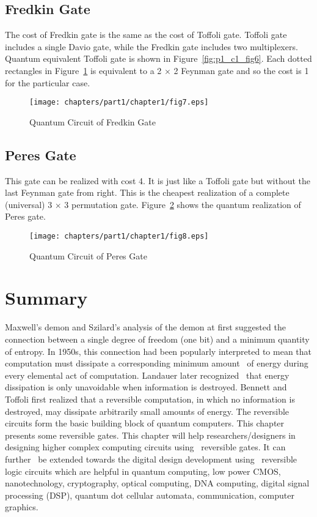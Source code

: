 \subsection{Fredkin Gate}
The cost of Fredkin gate is the same as the cost of Toffoli gate. Toffoli gate includes a single Davio gate, while the Fredkin gate includes two multiplexers. Quantum equivalent Toffoli gate is shown in Figure~\ref{fig:p1_c1_fig6}. Each dotted rectangles in Figure~\ref{fig:p1_c1_fig7} is equivalent to a 2 $\times$ 2 Feynman gate and so the cost is 1 for the particular case.

\begin{figure}[h]
\centering
\texttt{[image: chapters/part1/chapter1/fig7.eps]}
\caption{Quantum Circuit of Fredkin Gate}
\label{fig:p1_c1_fig7}
\end{figure}

\subsection{Peres Gate}
This gate can be realized with cost 4. It is just like a Toffoli gate but without the last Feynman gate from right. This is the cheapest realization of a complete (universal) 3 $\times$ 3 permutation gate. Figure~\ref{fig:p1_c1_fig8} shows the quantum realization of Peres gate.
\\
\begin{figure}[h]
\centering
\texttt{[image: chapters/part1/chapter1/fig8.eps]}
\caption{Quantum Circuit of Peres Gate}
\label{fig:p1_c1_fig8}
\end{figure}

\section{Summary}
Maxwell's demon and Szilard's analysis of the demon at first suggested the connection between a single degree of freedom (one bit) and a minimum quantity of entropy. In 1950s, this connection had been popularly interpreted to mean that computation must dissipate a corresponding minimum amount~ of energy during every elemental act of computation. Landauer later recognized~ that energy dissipation is only unavoidable when information is destroyed. Bennett and Toffoli first realized that a reversible computation, in which no information is destroyed, may dissipate arbitrarily small amounts of energy. The reversible circuits form the basic building block of quantum computers. This chapter presents some reversible gates. This chapter will help researchers/designers in designing higher complex computing circuits using~ reversible gates. It can further~ be extended towards the digital design development using~ reversible logic circuits which are helpful in quantum computing, low power CMOS, nanotechnology, cryptography, optical computing, DNA computing, digital signal processing (DSP), quantum dot cellular automata, communication, computer graphics.
